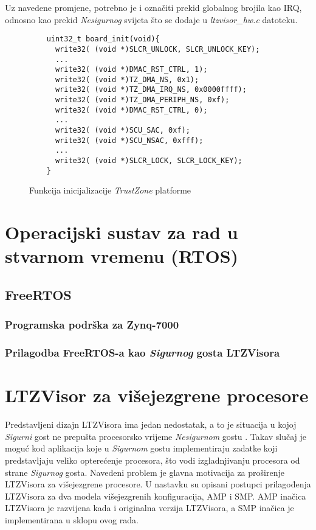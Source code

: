 \documentclass[times, utf8, diplomski, numeric]{fer}
\begin{document}
Uz navedene promjene, potrebno je i označiti prekid globalnog brojila kao IRQ, odnosno kao prekid \textit{Nesigurnog} svijeta što se
dodaje u \textit{ltzvisor\_hw.c} datoteku.
\begin{figure}[H]
  \lstset{breaklines=true, xleftmargin=.05\textwidth}
  \begin{lstlisting}
    uint32_t board_init(void){
      write32( (void *)SLCR_UNLOCK, SLCR_UNLOCK_KEY);
      ...
      write32( (void *)DMAC_RST_CTRL, 1);
      write32( (void *)TZ_DMA_NS, 0x1);
      write32( (void *)TZ_DMA_IRQ_NS, 0x0000ffff);
      write32( (void *)TZ_DMA_PERIPH_NS, 0xf);
      write32( (void *)DMAC_RST_CTRL, 0);
      ...
      write32( (void *)SCU_SAC, 0xf);
      write32( (void *)SCU_NSAC, 0xfff);
      ...
      write32( (void *)SLCR_LOCK, SLCR_LOCK_KEY);
    }
  \end{lstlisting}
  \caption{Funkcija inicijalizacije \textit{TrustZone} platforme}
  \label{tz_init}
\end{figure}

\chapter{Operacijski sustav za rad u stvarnom vremenu (RTOS)}
\section{FreeRTOS}
\subsection{Programska podrška za Zynq-7000}
\subsection{Prilagodba FreeRTOS-a kao \textit{Sigurnog} gosta LTZVisora}

\chapter{LTZVisor za višejezgrene procesore}
Predstavljeni dizajn LTZVisora ima jedan nedostatak, a to je situacija u kojoj \textit{Sigurni} gost ne prepušta procesorsko
vrijeme \textit{Nesigurnom} gostu \cite{amp_ltzvisor}. Takav slučaj je moguć kod aplikacija koje u \textit{Sigurnom} gostu
implementiraju zadatke koji predstavljaju veliko opterećenje procesora, što vodi izgladnjivanju procesora od strane
\textit{Sigurnog} gosta. Navedeni problem je glavna motivacija za proširenje LTZVisora za višejezgrene procesore. U nastavku su
opisani postupci prilagođenja LTZVisora za dva modela višejezgrenih konfiguracija, AMP i SMP. AMP inačica LTZVisora je razvijena
kada i originalna verzija LTZVisora, a SMP inačica je implementirana u sklopu ovog rada.
\end{document}
